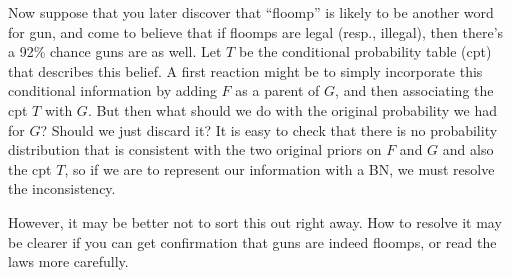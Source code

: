\documentclass{article}
\numberwithin{equation}{section}
\begin{document}
\begin{example}
		Now suppose that you later discover that ``floomp'' is likely to be another word for gun, and come to believe that if floomps are legal (resp., illegal), then there's a 92\% chance guns are as well.
		Let $T$ be the conditional probability table (cpt) that describes this belief.
		A first reaction might be to simply incorporate this conditional information by
		adding $F$ as a parent of $G$, and then associating the cpt $T$ with $G$.
		But then what should we do with the original probability we had
		for $G$?  Should we just discard it?
		It is easy to check that there is no probability distribution that is
		consistent with the two original priors on $F$ and $G$ and also the cpt
		$T$, so if we are to represent our information with a BN, we must
		resolve the inconsistency.  
			
%		
However, it may be better not to sort this out right away.
		How to resolve it may be clearer if you can get confirmation
		that guns are indeed floomps, or read the laws more carefully.



\end{example}
\end{document}
